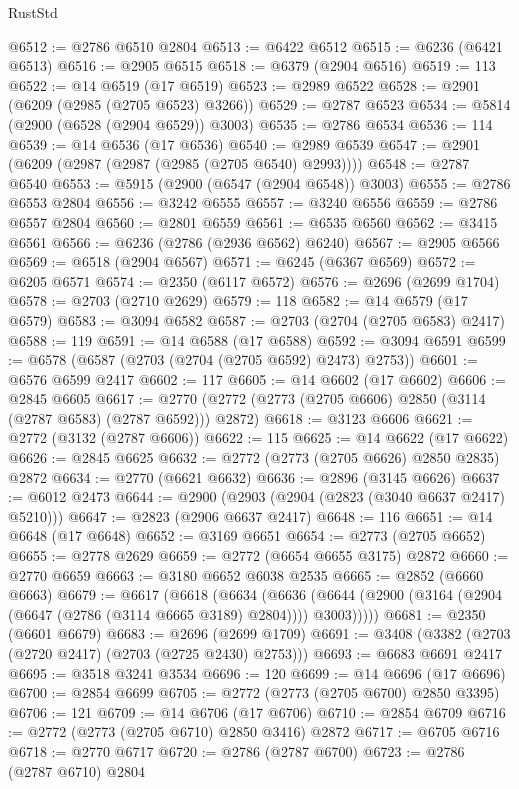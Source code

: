 \begin{lexlean}{RustStd}
\begin{coremodule}
@6512 := @2786 @6510 @2804
@6513 := @6422 @6512
@6515 := @6236 (@6421 @6513)
@6516 := @2905 @6515
@6518 := @6379 (@2904 @6516)
@6519 := 113
@6522 := @14 @6519 (@17 @6519)
@6523 := @2989 @6522
@6528 := @2901 (@6209 (@2985 (@2705 @6523) @3266))
@6529 := @2787 @6523
@6534 := @5814 (@2900 (@6528 (@2904 @6529)) @3003)
@6535 := @2786 @6534
@6536 := 114
@6539 := @14 @6536 (@17 @6536)
@6540 := @2989 @6539
@6547 := @2901 (@6209 (@2987 (@2987 (@2985 (@2705 @6540) @2993))))
@6548 := @2787 @6540
@6553 := @5915 (@2900 (@6547 (@2904 @6548)) @3003)
@6555 := @2786 @6553 @2804
@6556 := @3242 @6555
@6557 := @3240 @6556
@6559 := @2786 @6557 @2804
@6560 := @2801 @6559
@6561 := @6535 @6560
@6562 := @3415 @6561
@6566 := @6236 (@2786 (@2936 @6562) @6240)
@6567 := @2905 @6566
@6569 := @6518 (@2904 @6567)
@6571 := @6245 (@6367 @6569)
@6572 := @6205 @6571
@6574 := @2350 (@6117 @6572)
@6576 := @2696 (@2699 @1704)
@6578 := @2703 (@2710 @2629)
@6579 := 118
@6582 := @14 @6579 (@17 @6579)
@6583 := @3094 @6582
@6587 := @2703 (@2704 (@2705 @6583) @2417)
@6588 := 119
@6591 := @14 @6588 (@17 @6588)
@6592 := @3094 @6591
@6599 := @6578 (@6587 (@2703 (@2704 (@2705 @6592) @2473) @2753))
@6601 := @6576 @6599 @2417
@6602 := 117
@6605 := @14 @6602 (@17 @6602)
@6606 := @2845 @6605
@6617 := @2770 (@2772 (@2773 (@2705 @6606) @2850 (@3114 (@2787 @6583) (@2787 @6592))) @2872)
@6618 := @3123 @6606
@6621 := @2772 (@3132 (@2787 @6606))
@6622 := 115
@6625 := @14 @6622 (@17 @6622)
@6626 := @2845 @6625
@6632 := @2772 (@2773 (@2705 @6626) @2850 @2835) @2872
@6634 := @2770 (@6621 @6632)
@6636 := @2896 (@3145 @6626)
@6637 := @6012 @2473
@6644 := @2900 (@2903 (@2904 (@2823 (@3040 @6637 @2417) @5210)))
@6647 := @2823 (@2906 @6637 @2417)
@6648 := 116
@6651 := @14 @6648 (@17 @6648)
@6652 := @3169 @6651
@6654 := @2773 (@2705 @6652)
@6655 := @2778 @2629
@6659 := @2772 (@6654 @6655 @3175) @2872
@6660 := @2770 @6659
@6663 := @3180 @6652 @6038 @2535
@6665 := @2852 (@6660 @6663)
@6679 := @6617
    (@6618
      (@6634
        (@6636 (@6644 (@2900 (@3164 (@2904 (@6647 (@2786 (@3114 @6665 @3189) @2804)))) @3003)))))
@6681 := @2350 (@6601 @6679)
@6683 := @2696 (@2699 @1709)
@6691 := @3408 (@3382 (@2703 (@2720 @2417) (@2703 (@2725 @2430) @2753)))
@6693 := @6683 @6691 @2417
@6695 := @3518 @3241 @3534
@6696 := 120
@6699 := @14 @6696 (@17 @6696)
@6700 := @2854 @6699
@6705 := @2772 (@2773 (@2705 @6700) @2850 @3395)
@6706 := 121
@6709 := @14 @6706 (@17 @6706)
@6710 := @2854 @6709
@6716 := @2772 (@2773 (@2705 @6710) @2850 @3416) @2872
@6717 := @6705 @6716
@6718 := @2770 @6717
@6720 := @2786 (@2787 @6700)
@6723 := @2786 (@2787 @6710) @2804

\end{coremodule}
\end{lexlean}
